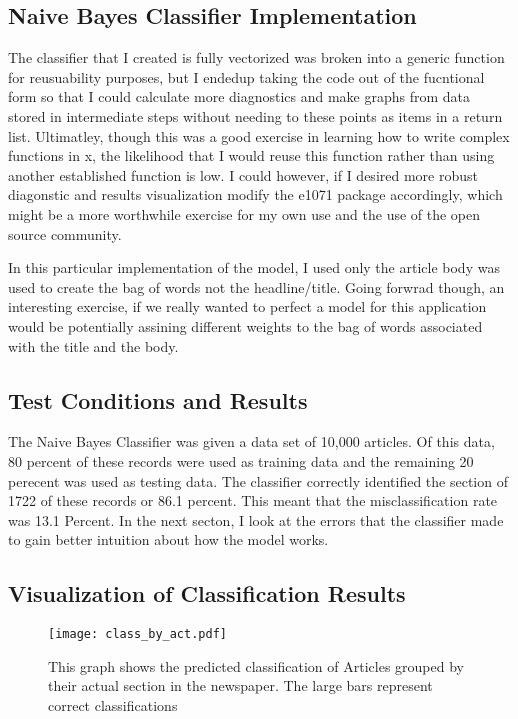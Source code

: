 \documentclass{article}
\begin{document}
\subsection{Naive Bayes Classifier Implementation}

The classifier that I created is fully vectorized was broken into a generic function for reusuability purposes, but I endedup taking the code out of the fucntional form so that I could calculate more diagnostics and make graphs from data stored in intermediate steps without needing to these points as items in a return list.  Ultimatley, though this was a good exercise in learning how to write complex functions in x, the likelihood that I would reuse this function rather than using another established function is low.  I could however, if I desired more robust diagonstic and results visualization modify the e1071 package accordingly, which might be a more worthwhile exercise for my own use and the use of the open source community. 

In this particular implementation of the model, I used only the article body was used to create the bag of words not the headline/title.  Going forwrad though, an interesting exercise, if we really wanted to perfect a model for this application would be potentially assining different weights to the bag of words associated with the title and the body.

\subsection{Test Conditions and  Results}

The Naive Bayes Classifier was given a data set of 10,000 articles.  Of this data, 80 percent of these records were used as training data and the remaining 20 perecent was used as testing data.  The classifier correctly identified the section of 1722 of these records or 86.1 percent. This meant that the misclassification rate was 13.1 Percent.  In the next secton, I look at the errors that the classifier made to gain better intuition about how the model works.

\subsection{Visualization of Classification Results}


\begin{figure}[H]
\begin{center}
\texttt{[image: class\_by\_act.pdf]}
\caption{This graph shows the predicted classification of Articles grouped by their actual section in the newspaper.  The large bars represent correct classifications}
\end{center}
\end{figure}
\end{document}
